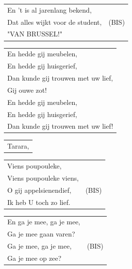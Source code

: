 \documentclass{article}
\begin{document}
\begin{flushleft}
\begin{tabularx}{0.8\textwidth} {
   >{\raggedright\arraybackslash}X | c}
En ’t is al jarenlang bekend, & \\
Dat alles wijkt voor de student, & (BIS)\\
"VAN BRUSSEL!" & \\
\end{tabularx}
\end{flushleft}\begin{flushleft}
\begin{tabularx}{0.8\textwidth} {
   >{\raggedright\arraybackslash}X}
En hedde gij meubelen,\\
En hedde gij huisgerief,\\
Dan kunde gij trouwen met uw lief,\\
Gij ouwe zot!\\
En hedde gij meubelen,\\
En hedde gij huisgerief,\\
Dan kunde gij trouwen met uw lief!\\
\end{tabularx}
\end{flushleft}\begin{flushleft}
\begin{tabularx}{0.8\textwidth} {
   >{\raggedright\arraybackslash}X}
Tarara,\\\end{tabularx}
\begin{tabularx}{0.8\textwidth} {
   >{\raggedright\arraybackslash}X|c}
Viens poupouleke, &\\
Viens poupouleke viens, & \\
O gij appelsienendief, & (BIS)\\
Ik heb U toch zo lief. &\\
\end{tabularx}
\end{flushleft}\begin{flushleft}
\begin{tabularx}{0.8\textwidth} {
   >{\raggedright\arraybackslash}X|c}
En ga je mee, ga je mee, & \\
Ga je mee gaan varen? & \\
Ga je mee, ga je mee, & (BIS)\\
Ga je mee op zee? & \\
\end{tabularx}
\end{flushleft}\begin{flushleft}
\begin{tabularx}{0.8\textwidth} {
   >{\raggedright\arraybackslash}X}

\end{tabularx}
\end{flushleft}
\end{document}
